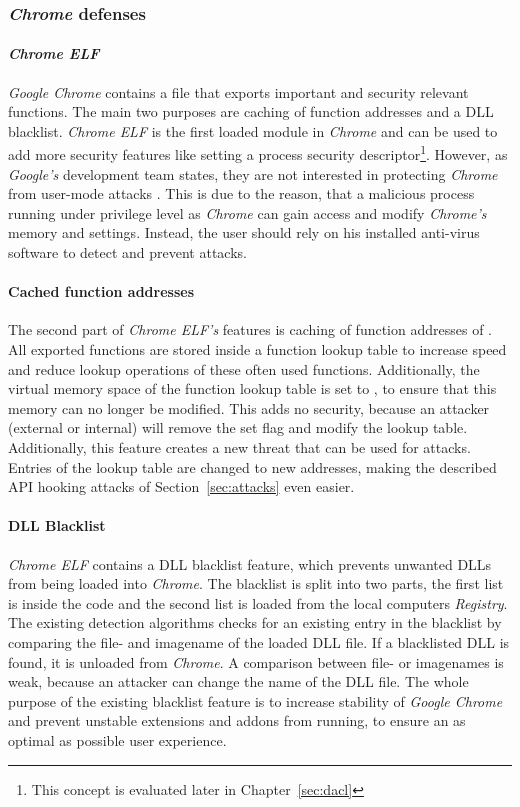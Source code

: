 \subsubsection{\emph{Chrome} defenses}
\paragraph{\emph{Chrome ELF}}
\emph{Google Chrome} contains a  file that exports important and security relevant functions. The main two purposes are caching of function addresses and a \gls{DLL} blacklist. \emph{Chrome ELF} is the first loaded module in \emph{Chrome} and can be used to add more security features like setting a process security descriptor\footnote{This concept is evaluated later in Chapter~\ref{sec:dacl}}. However, as \emph{Google's} development team states, they are not interested in protecting \emph{Chrome} from user-mode attacks \cite{chromium_security}. This is due to the reason, that a malicious process running under privilege level as \emph{Chrome} can gain access and modify \emph{Chrome's} memory and settings. Instead, the user should rely on his installed anti-virus software to detect and prevent attacks.

\paragraph{Cached function addresses}
The second part of \emph{Chrome ELF's} features is caching of function addresses of . All exported functions are stored inside a function lookup table to increase speed and reduce lookup operations of these often used functions. Additionally, the virtual memory space of the function lookup table is set to , to ensure that this memory can no longer be modified. This adds no security, because an attacker (external or internal) will remove the set  flag and modify the lookup table. Additionally, this feature creates a new threat that can be used for attacks. Entries of the lookup table are changed to new addresses, making the described \gls{API} hooking attacks of Section~\ref{sec:attacks} even easier.

\paragraph{DLL Blacklist}
\emph{Chrome ELF} contains a \gls{DLL} blacklist feature, which prevents unwanted \glspl{DLL} from being loaded into \emph{Chrome}. The blacklist is split into two parts, the first list is inside the code and the second list is loaded from the local computers \emph{Registry}. The existing detection algorithms checks for an existing entry in the blacklist by comparing the file- and imagename of the loaded \gls{DLL} file. If a blacklisted \gls{DLL} is found, it is unloaded from \emph{Chrome}. A comparison between file- or imagenames is weak, because an attacker can change the name of the \gls{DLL} file. The whole purpose of the existing blacklist feature is to increase stability of \emph{Google Chrome} and prevent unstable extensions and addons from running, to ensure an as optimal as possible user experience.